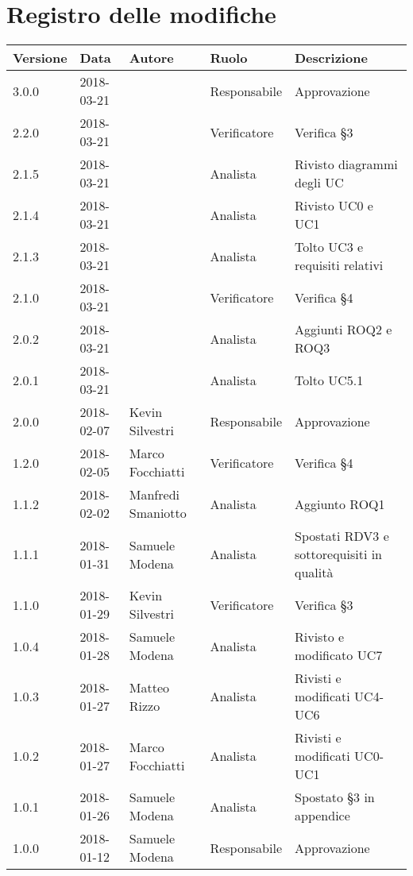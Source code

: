 \documentclass[./AnalisideiRequisiti.tex]{subfiles}
\begin{document}
	
{
	\chapter*{Registro delle modifiche}
\setlength\LTleft{-22mm}
	\begin{longtable}{|p{20mm}|p{20mm}|p{40mm}|p{30mm}|p{50mm}|}
		\hline
		\textbf{Versione} & \textbf{Data} & \textbf{Autore} & \textbf{Ruolo} & \textbf{Descrizione} \\ \hline 
		    
		3.0.0 & 2018-03-21 &  & Responsabile & Approvazione\\ \hline 
		2.2.0 & 2018-03-21 &  & Verificatore & Verifica §3\\ \hline 
		2.1.5 & 2018-03-21 &  & Analista & Rivisto diagrammi degli UC\\ \hline
		2.1.4 & 2018-03-21 &  & Analista & Rivisto UC0 e UC1\\ \hline
		2.1.3 & 2018-03-21 &  & Analista & Tolto UC3 e requisiti relativi\\ \hline
		2.1.0 & 2018-03-21 &  & Verificatore & Verifica §4\\ \hline
		2.0.2 & 2018-03-21 &  & Analista & Aggiunti ROQ2 e ROQ3\\ \hline
		2.0.1 & 2018-03-21 &  & Analista & Tolto UC5.1\\ \hline
		2.0.0 & 2018-02-07 & Kevin Silvestri & Responsabile & Approvazione\\ \hline 
		1.2.0 & 2018-02-05 & Marco Focchiatti & Verificatore & Verifica §4\\ \hline    
		1.1.2 & 2018-02-02 & Manfredi Smaniotto & Analista & Aggiunto ROQ1\\ \hline 
		1.1.1 & 2018-01-31 & Samuele Modena & Analista & Spostati RDV3 e sottorequisiti in qualità\\ \hline  
		1.1.0 & 2018-01-29 & Kevin Silvestri & Verificatore & Verifica §3\\ \hline  
		1.0.4 & 2018-01-28 & Samuele Modena & Analista & Rivisto e modificato UC7\\ \hline  
		1.0.3 & 2018-01-27 & Matteo Rizzo & Analista & Rivisti e modificati UC4-UC6\\ \hline    
		1.0.2 & 2018-01-27 & Marco Focchiatti & Analista & Rivisti e modificati UC0-UC1\\ \hline  
		1.0.1 & 2018-01-26 & Samuele Modena & Analista & Spostato §3 in appendice\\ \hline
		1.0.0 & 2018-01-12 & Samuele Modena & Responsabile & Approvazione\\ \hline

\end{longtable}}
\end{document}
